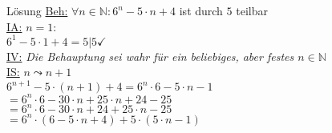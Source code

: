 \begin{frame}{Lösung}
	\underline{Beh:} $\forall n\in\mathbb{N}: 6^{n}-5\cdot n+4$ ist durch $5$ teilbar\\
	\underline{IA:} $n=1:$\\
	\qquad$6^{1}-5\cdot 1+4=5\vert 5\checkmark$\\
	\underline{IV:} \emph{Die Behauptung sei wahr für ein beliebiges, aber festes $n\in\mathbb{N}$}\\
	\underline{IS:} $n\leadsto n+1$\\
	\qquad $6^{n+1}-5\cdot (n+1)+4=6^{n}\cdot 6-5\cdot n-1$\\
	\pause
	\qquad$=6^{n}\cdot 6-30\cdot n + 25\cdot n+24-25$\\
	\pause
	\qquad $=6^{n}\cdot 6-30\cdot n+24+25\cdot n-25$\\
	\pause
	\qquad $=6^{n}\cdot(6-5\cdot n+4)+5\cdot(5\cdot n-1)$\\
\end{frame}

